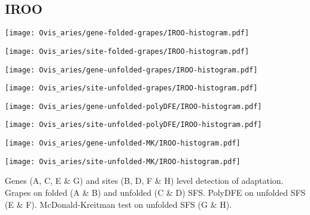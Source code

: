 \documentclass{article}
\begin{document}
\pagebreak
\subsection{IROO}
\centering
\begin{minipage}{0.49\linewidth}
    \texttt{[image: Ovis\_aries/gene-folded-grapes/IROO-histogram.pdf]}
\end{minipage}%
\hfill
\begin{minipage}{0.49\linewidth}
    \texttt{[image: Ovis\_aries/site-folded-grapes/IROO-histogram.pdf]}
\end{minipage}
\hfill
\begin{minipage}{0.49\linewidth}
    \texttt{[image: Ovis\_aries/gene-unfolded-grapes/IROO-histogram.pdf]}
\end{minipage}%
\hfill
\begin{minipage}{0.49\linewidth}
    \texttt{[image: Ovis\_aries/site-unfolded-grapes/IROO-histogram.pdf]}
\end{minipage}
\hfill
\begin{minipage}{0.49\linewidth}
    \texttt{[image: Ovis\_aries/gene-unfolded-polyDFE/IROO-histogram.pdf]}
\end{minipage}%
\hfill
\begin{minipage}{0.49\linewidth}
    \texttt{[image: Ovis\_aries/site-unfolded-polyDFE/IROO-histogram.pdf]}
\end{minipage}
\hfill
\begin{minipage}{0.49\linewidth}
    \texttt{[image: Ovis\_aries/gene-unfolded-MK/IROO-histogram.pdf]}
\end{minipage}%
\hfill
\begin{minipage}{0.49\linewidth}
    \texttt{[image: Ovis\_aries/site-unfolded-MK/IROO-histogram.pdf]}
\end{minipage}
\hfill
\flushleft
Genes (A, C, E \& G) and sites (B, D, F \& H) level detection of adaptation.
Grapes on folded (A \& B) and unfolded (C \& D) SFS.
PolyDFE on unfolded SFS (E \& F).
McDonald-Kreitman test on unfolded SFS (G \& H).
\end{document}
